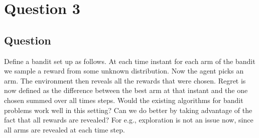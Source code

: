 \documentclass[english]{article}
\begin{document}
\section{Question 3}
\subsection{Question}
Define a bandit set up as follows. At each time instant for each arm of the bandit we sample a reward from some unknown distribution. Now the agent picks an arm. The environment then reveals all the rewards that were chosen. Regret is now defined as the difference between the best arm at that instant and the one chosen summed over all times steps. Would the existing algorithms for bandit problems work well in this setting? Can we do better by taking advantage of the fact that all rewards are revealed? For e.g., exploration is not an issue now, since all arms are revealed at each time step.
\end{document}
